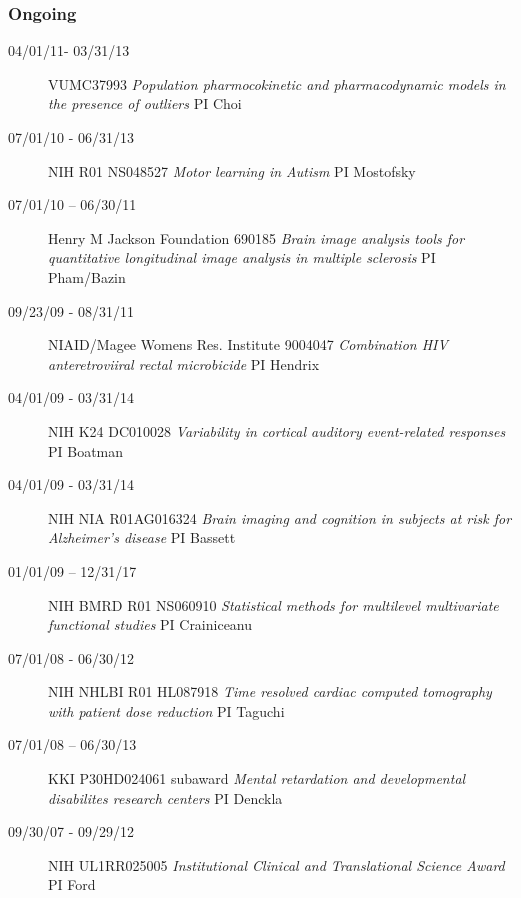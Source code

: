 \documentclass[12pt]{article}
\begin{document}
\subsubsection*{Ongoing}
\begin{description}
\item[\textnormal{04/01/11- 03/31/13}] VUMC37993 {\it Population pharmocokinetic and pharmacodynamic models in the presence of outliers} PI Choi
\item[\textnormal{07/01/10 - 06/31/13}] NIH R01 NS048527 {\it Motor learning in Autism} PI Mostofsky
\item[\textnormal{07/01/10 – 06/30/11}] Henry M Jackson Foundation 690185 {\it Brain image analysis tools for quantitative longitudinal image analysis in multiple sclerosis} PI Pham/Bazin
\item[\textnormal{09/23/09 - 08/31/11}] NIAID/Magee Womens Res. Institute 9004047 {\it Combination HIV anteretroviiral rectal microbicide} PI Hendrix
\item[\textnormal{04/01/09 - 03/31/14}] NIH K24 DC010028 {\it Variability in cortical auditory event-related responses} PI Boatman 	
\item[\textnormal{04/01/09 - 03/31/14}] NIH NIA R01AG016324 {\it Brain imaging and cognition in subjects at risk for Alzheimer’s disease} PI Bassett 	
\item[\textnormal{01/01/09 – 12/31/17}] NIH BMRD R01 NS060910 {\it Statistical methods for multilevel multivariate functional studies} PI Crainiceanu 
\item[\textnormal{07/01/08 - 06/30/12}] NIH NHLBI R01 HL087918 {\it Time resolved cardiac computed tomography with patient dose reduction} PI Taguchi
\item[\textnormal{07/01/08 – 06/30/13}] KKI P30HD024061 subaward {\it Mental retardation and developmental disabilites research centers} PI Denckla
\item[\textnormal{09/30/07 - 09/29/12}] NIH UL1RR025005 {\it Institutional Clinical and Translational Science Award} PI Ford
\end{description}
\end{document}

